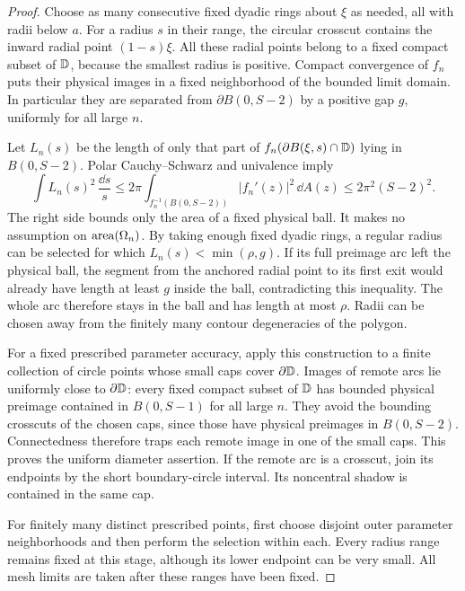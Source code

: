 \begin{proof}
Choose as many consecutive fixed dyadic rings about \(\xi\)
as needed, all with radii below \(a\). For a radius \(s\) in
their range, the circular crosscut contains the inward radial
point \((1-s)\xi\). All these radial points belong to a fixed
compact subset of \(\mathbb D\), because the smallest radius is
positive. Compact convergence of \(f_n\) puts their physical
images in a fixed neighborhood of the bounded limit domain.
In particular they are separated from \(\partial B(0,S-2)\)
by a positive gap \(g\), uniformly for all large \(n\).

Let \(L_n(s)\) be the length of only that part of
\(f_n(\partial B(\xi,s)\cap\mathbb D)\) lying in \(B(0,S-2)\).
Polar Cauchy--Schwarz and univalence imply
\begin{equation}
 \int L_n(s)^2\,\frac{\dd s}{s}
 \le 2\pi
 \int_{f_n^{-1}(B(0,S-2))}|f_n'(z)|^2\,\dd A(z)
 \le 2\pi^2(S-2)^2 .
 \label{loc:restricted-area}
\end{equation}
The right side bounds only the area of a fixed physical ball.
It makes no assumption on \(\operatorname{area}(\Omega_n)\).
By taking enough fixed dyadic rings, a regular radius can be
selected for which \(L_n(s)<\min(\rho,g)\).
If its full preimage arc left the physical ball, the segment
from the anchored radial point to its first exit would already
have length at least \(g\) inside the ball, contradicting this
inequality. The whole arc therefore stays in the ball and has
length at most \(\rho\). Radii can be chosen away from the
finitely many contour degeneracies of the polygon.

For a fixed prescribed parameter accuracy, apply this
construction to a finite collection of circle points whose
small caps cover \(\partial\mathbb D\). Images of remote arcs lie
uniformly close to \(\partial\mathbb D\): every fixed compact subset
of \(\mathbb D\) has bounded physical preimage contained in
\(B(0,S-1)\) for all large \(n\). They avoid the bounding
crosscuts of the chosen caps, since those have physical
preimages in \(B(0,S-2)\). Connectedness therefore traps each
remote image in one of the small caps. This proves the
uniform diameter assertion. If the remote arc is a crosscut,
join its endpoints by the short boundary-circle interval.
Its noncentral shadow is contained in the same cap.

For finitely many distinct prescribed points, first choose
disjoint outer parameter neighborhoods and then perform the
selection within each. Every radius range remains fixed at
this stage, although its lower endpoint can be very small.
All mesh limits are taken after these ranges have been fixed.
\end{proof}

